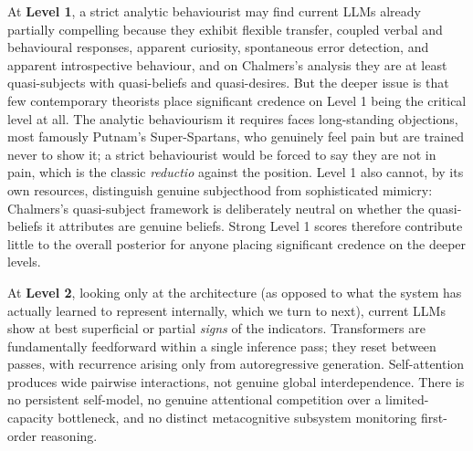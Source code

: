\documentclass[11pt, a4paper, onecolumn, gdm]{google}
\begin{document}
At \textbf{Level 1}, a strict analytic behaviourist may find current LLMs already partially compelling because they exhibit flexible transfer, coupled verbal and behavioural responses, apparent curiosity, spontaneous error detection, and apparent introspective behaviour, and on Chalmers's \citeyearpar{chalmers2026} analysis they are at least quasi-subjects with quasi-beliefs and quasi-desires.
But the deeper issue is that few contemporary theorists place significant credence on Level 1 being the critical level at all.
The analytic behaviourism it requires faces long-standing objections, most famously Putnam's Super-Spartans, who genuinely feel pain but are trained never to show it; a strict behaviourist would be forced to say they are not in pain, which is the classic \emph{reductio} against the position.
Level 1 also cannot, by its own resources, distinguish genuine subjecthood from sophisticated mimicry: Chalmers's quasi-subject framework is deliberately neutral on whether the quasi-beliefs it attributes are genuine beliefs.
Strong Level 1 scores therefore contribute little to the overall posterior for anyone placing significant credence on the deeper levels.

At \textbf{Level 2}, looking only at the architecture (as opposed to what the system has actually learned to represent internally, which we turn to next), current LLMs show at best superficial or partial \emph{signs} of the indicators.
Transformers are fundamentally feedforward within a single inference pass; they reset between passes, with recurrence arising only from autoregressive generation.
Self-attention produces wide pairwise interactions, not genuine global interdependence.
There is no persistent self-model, no genuine attentional competition over a limited-capacity bottleneck, and no distinct metacognitive subsystem monitoring first-order reasoning.
\end{document}
